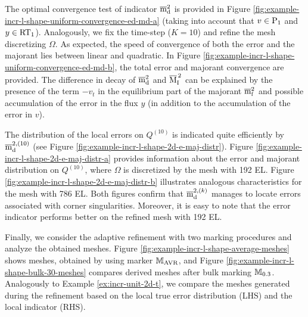 \begin{example}
\clearpage
The optimal convergence test of indicator $\overline{\mathrm m}^2_{\mathrm{d}}$ is 
provided in Figure \ref{fig:example-incr-l-shape-uniform-convergence-ed-md-a} 
(taking into account that  $v \in {\rm P}_{1}$ and $y \in {\rm RT}_{1}$). Analogously,
we fix the time-step ($K  = 10$) and refine the mesh discretizing $\Omega$. 
As expected, the speed of convergence of both the error and the majorant lies between linear and quadratic. In Figure \ref{fig:example-incr-l-shape-uniform-convergence-ed-md-b}, the total error and majorant convergence are provided. The difference in decay of $\overline{\mathrm m}^2_{\mathrm{d}}$ and $\overline{\mathrm M}^{\,2}_{\mathrm{I}}$ can be explained by the presence
of the term $-v_t$ in the equilibrium part of the majorant $\overline{\mathrm m}^2_{\mathrm{f}}$ and possible accumulation of the error in the flux $y$ (in addition to the accumulation of the error in
$v$). 

The distribution of the local errors
on $Q^{(10)}$ is indicated quite efficiently by $\overline{\mathrm m}^{2, ({10})}_{\mathrm{d}}$ 
(see Figure \ref{fig:example-incr-l-shape-2d-e-maj-distr}). 
Figure \ref{fig:example-incr-l-shape-2d-e-maj-distr-a} provides information about the error
and majorant distribution on $Q^{(10)}$, where $\Omega$ is discretized by the mesh with 
192 EL. Figure \ref{fig:example-incr-l-shape-2d-e-maj-distr-b} illustrates analogous
characteristics for the mesh with 786 EL. Both figures confirm that $\overline{\mathrm m}^{2, ({k})}_{\mathrm{d}}$ manages to locate errors associated with corner singularities. Moreover, it is easy to note that 
the error indicator performs better on the refined mesh with 192 EL.

Finally, we consider the adaptive refinement with two marking procedures 
and analyze the obtained meshes. Figure \ref{fig:example-incr-l-shape-average-meshes} 
shows meshes, obtained by using marker ${\mathbb M}_{\rm AVR}$, and 
Figure \ref{fig:example-incr-l-shape-bulk-30-meshes} compares derived meshes after bulk 
marking ${\mathbb M}_{0.3}$. Analogously to Example \ref{ex:incr-unit-2d-t}, we compare 
the meshes generated during the refinement based on the local true error distribution (LHS) 
and the local indicator (RHS). 

\end{example}




